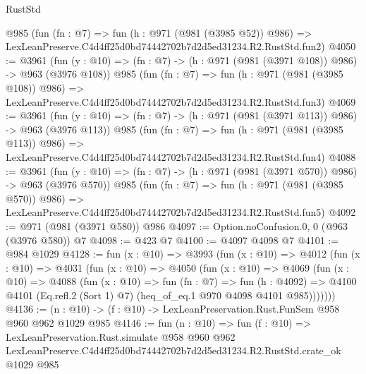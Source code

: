 \begin{lexlean}{RustStd}
\begin{coremodule}
    @985
    (fun (fn : @7) =>
    fun (h : @971 (@981 (@3985 @52)) @986) =>
    LexLeanPreserve.C4d4ff25d0bd74442702b7d2d5ed31234.R2.RustStd.fun2)
@4050 := @3961
    (fun (y : @10) => (fn : @7) -> (h : @971 (@981 (@3971 @108)) @986) -> @963 (@3976 @108))
    @985
    (fun (fn : @7) =>
    fun (h : @971 (@981 (@3985 @108)) @986) =>
    LexLeanPreserve.C4d4ff25d0bd74442702b7d2d5ed31234.R2.RustStd.fun3)
@4069 := @3961
    (fun (y : @10) => (fn : @7) -> (h : @971 (@981 (@3971 @113)) @986) -> @963 (@3976 @113))
    @985
    (fun (fn : @7) =>
    fun (h : @971 (@981 (@3985 @113)) @986) =>
    LexLeanPreserve.C4d4ff25d0bd74442702b7d2d5ed31234.R2.RustStd.fun4)
@4088 := @3961
    (fun (y : @10) => (fn : @7) -> (h : @971 (@981 (@3971 @570)) @986) -> @963 (@3976 @570))
    @985
    (fun (fn : @7) =>
    fun (h : @971 (@981 (@3985 @570)) @986) =>
    LexLeanPreserve.C4d4ff25d0bd74442702b7d2d5ed31234.R2.RustStd.fun5)
@4092 := @971 (@981 (@3971 @580)) @986
@4097 := Option.noConfusion.{0, 0} (@963 (@3976 @580)) @7
@4098 := @423 @7
@4100 := @4097 @4098 @7
@4101 := @984 @1029
@4128 := fun (x : @10) =>
  @3993
    (fun (x : @10) =>
    @4012
      (fun (x : @10) =>
      @4031
        (fun (x : @10) =>
        @4050
          (fun (x : @10) =>
          @4069
            (fun (x : @10) =>
            @4088
              (fun (x : @10) =>
              fun (fn : @7) =>
              fun (h : @4092) =>
              @4100 @4101 (Eq.refl.{2} (Sort 1) @7) (heq_of_eq.{1} @970 @4098 @4101 @985)))))))
@4136 := (n : @10) -> (f : @10) -> LexLeanPreservation.Rust.FunSem @958 @960 @962 @1029 @985
@4146 := fun (n : @10) =>
  fun (f : @10) =>
  LexLeanPreservation.Rust.simulate
    @958
    @960
    @962
    LexLeanPreserve.C4d4ff25d0bd74442702b7d2d5ed31234.R2.RustStd.crate_ok
    @1029
    @985
\end{coremodule}
\end{lexlean}
